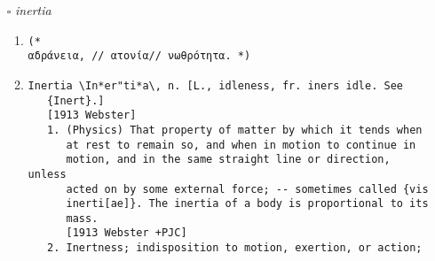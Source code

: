 \documentclass{article}
\begin{document}
\begin{itemize}
\begin{enumerate}
\item{
\begin{lstlisting}
(* 
Ουσ. λιώσιμο, τήξη, // εποχή που λιώνουν οι πάγοι ή τα χιόνια// μαλάκωμα (μτφ. για συμπεριφορά) Ρημ. επιφέρω ή υφίσταμαι τήξη// μαλακώνω (μτφ. για συμπεριφορά) *)
\end{lstlisting}}
\item{
\begin{lstlisting}
thaw \thaw\, n.
   The melting of ice, snow, or other congealed matter; the
   resolution of ice, or the like, into the state of a fluid;
   liquefaction by heat of anything congealed by frost; also, a
   warmth of weather sufficient to melt that which is congealed.
   --Dryden.
   [1913 Webster]
thaw \thaw\ (th[add]), v. i. [imp. & p. p. {Thawed} (th[add]d);
   p. pr. & vb. n. {Thawing}.] [AS. [thorn][=a]wian,
   [thorn][=a]wan; akin to D. dovijen, G. tauen, thauen (cf.
   also verdauen to digest, OHG. douwen, firdouwen), Icel.
   [thorn]eyja, Sw. t["o]a, Dan. t["o]e, and perhaps to Gr.
   th`kein to melt. [root]56.]
   1. To melt, dissolve, or become fluid; to soften; -- said of
      that which is frozen; as, the ice thaws.
      [1913 Webster]
   2. To become so warm as to melt ice and snow; -- said in
      reference to the weather, and used impersonally.
      [1913 Webster]
   3. Fig.: To grow gentle or genial. Compare {cold}[4], a. and
      {hard}[6], a.
      [1913 Webster +PJC]
thaw \thaw\, v. t.
   To cause (frozen things, as earth, snow, ice) to melt,
   soften, or dissolve.
   [1913 Webster]
\end{lstlisting}}
\end{enumerate}
\item[$\square$] \emph{ inertia }
\begin{enumerate}
\item{
\begin{lstlisting}
(* 
αδράνεια, // ατονία// νωθρότητα. *)
\end{lstlisting}}
\item{
\begin{lstlisting}
Inertia \In*er"ti*a\, n. [L., idleness, fr. iners idle. See
   {Inert}.]
   [1913 Webster]
   1. (Physics) That property of matter by which it tends when
      at rest to remain so, and when in motion to continue in
      motion, and in the same straight line or direction, unless
      acted on by some external force; -- sometimes called {vis
      inerti[ae]}. The inertia of a body is proportional to its
      mass.
      [1913 Webster +PJC]
   2. Inertness; indisposition to motion, exertion, or action;

\end{lstlisting}}
\end{enumerate}
\end{itemize}
\end{document}
